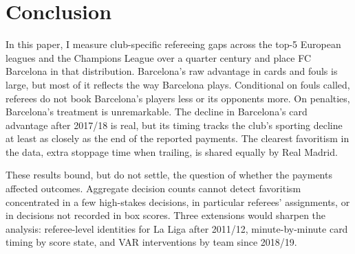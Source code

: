 \section{Conclusion}\label{sec:conclusion}

In this paper, I measure club-specific refereeing gaps across the top-5 European leagues and the Champions League over a quarter century and place FC Barcelona in that distribution. Barcelona's raw advantage in cards and fouls is large, but most of it reflects the way Barcelona plays. Conditional on fouls called, referees do not book Barcelona's players less or its opponents more. On penalties, Barcelona's treatment is unremarkable. The decline in Barcelona's card advantage after 2017/18 is real, but its timing tracks the club's sporting decline at least as closely as the end of the reported payments. The clearest favoritism in the data, extra stoppage time when trailing, is shared equally by Real Madrid.

These results bound, but do not settle, the question of whether the payments affected outcomes. Aggregate decision counts cannot detect favoritism concentrated in a few high-stakes decisions, in particular referees' assignments, or in decisions not recorded in box scores. Three extensions would sharpen the analysis: referee-level identities for La Liga after 2011/12, minute-by-minute card timing by score state, and VAR interventions by team since 2018/19.

